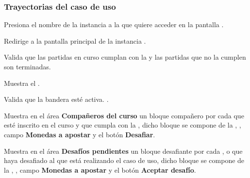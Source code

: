 \begin{UseCase}
{	}








\end{UseCase}

\subsubsection{Trayectorias del caso de uso}

\begin{UCtrayectoria}%
%

    \Actor Presiona el nombre de la instancia a la que quiere acceder en la pantalla .

    \Sistema Redirige a la pantalla principal de la instancia .

    \Sistema Valida que las partidas en curso cumplan con la  y las partidas que no la cumplen son terminadas.

    \Sistema Muestra el .

    \Sistema Valida que la bandera  esté activa. .

    \Sistema Muestra en el área {\bf Compañeros del curso} un bloque compañero por cada  que esté inscrito en el curso y que cumpla con la , dicho bloque se compone de la , , campo {\bf Monedas a apostar} y el botón {\bf Desafiar}.

    \Sistema Muestra en el área {\bf Desafíos pendientes} un bloque desafiante por cada ,  o  que haya desafiado al  que está realizando el caso de uso, dicho bloque se compone de la , , campo {\bf Monedas a apostar} y el botón {\bf Aceptar desafío}.

\end{UCtrayectoria}

